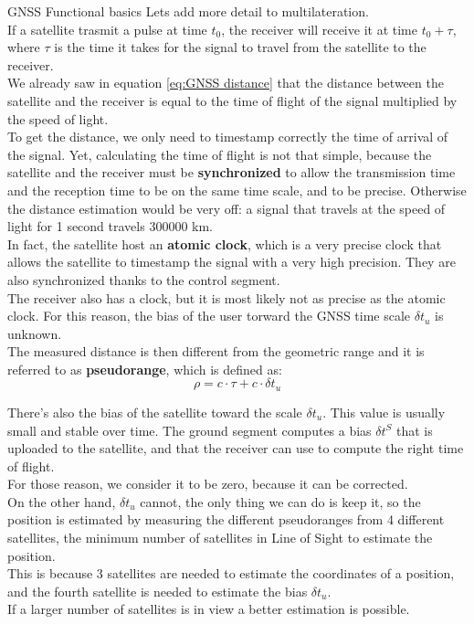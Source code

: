   \begin{section}{GNSS Functional basics}
    Lets add more detail to multilateration.\\
    If a satellite trasmit a pulse at time $t_0$, the receiver will receive it at time $t_0+\tau$,
    where $\tau$ is the time it takes for the signal to travel from the satellite to the receiver.\\
    We already saw in equation \ref{eq:GNSS distance} that the distance between the satellite and the
    receiver is equal to the time of flight of the signal multiplied by the speed of light.\\

    To get the distance, we only need to timestamp correctly the time of arrival of the signal.
    Yet, calculating the time of flight is not that simple, because the satellite and the receiver
    must be \textbf{synchronized} to allow the transmission time and the reception time to be on the 
    same time scale, and to be precise. Otherwise the distance estimation would be very off: 
    a signal that travels at the speed of light for 1 second travels 300000 km.\\
    In fact, the satellite host an \textbf{atomic clock}, which is a very precise clock that allows
    the satellite to timestamp the signal with a very high precision. They are also synchronized thanks
    to the control segment.\\
    The receiver also has a clock, but it is most likely not as precise as the atomic clock. 
    For this reason, the bias of the user torward the GNSS time scale $\delta t_u$ is unknown.\\
    The measured distance is then different from the geometric range and it is referred
    to as \textbf{pseudorange}, which is defined as:
    \begin{equation}
      \rho = c \cdot \tau + c \cdot \delta t_u
      \label{eq:GNSS pseudorange}
    \end{equation}

    There's also the bias of the satellite toward the scale $\delta t_u$. 
    This value is usually small and stable over time. The ground segment computes a bias $\delta t^S$
    that is uploaded to the satellite, and that the receiver can use to compute the right time of 
    flight.\\
    For those reason, we consider it to be zero, because it can be corrected.\\

    On the other hand, $\delta t_u$ cannot, the only thing we can do is keep it, so the position 
    is estimated by measuring the different pseudoranges from 4 different satellites, the minimum
    number of satellites in Line of Sight to estimate the position.\\
    This is because 3 satellites are needed to estimate the coordinates of a position, and the fourth
    satellite is needed to estimate the bias $\delta t_u$.\\
    If a larger number of satellites is in view a better estimation is possible.\\


\end{section}
